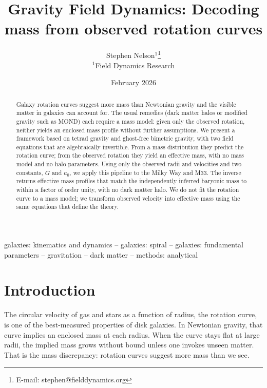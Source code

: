 \documentclass[fleqn,usenatbib]{mnras}
\title{Gravity Field Dynamics: Decoding mass from observed rotation curves}
\author[S. Nelson]{Stephen Nelson$^{1}$\thanks{E-mail: stephen@fielddynamics.org}\\
$^{1}$Field Dynamics Research}
\date{February 2026}
\begin{document}
\maketitle

\begin{abstract}
Galaxy rotation curves suggest more mass than Newtonian gravity and the visible matter in galaxies can account for. The usual remedies (dark matter halos or modified gravity such as MOND) each require a mass model: given only the observed rotation, neither yields an enclosed mass profile without further assumptions. We present a framework based on tetrad gravity and ghost-free bimetric gravity, with two field equations that are algebraically invertible. From a mass distribution they predict the rotation curve; from the observed rotation they yield an effective mass, with no mass model and no halo parameters. Using only the observed radii and velocities and two constants, $G$ and $a_0$, we apply this pipeline to the Milky Way and M33. The inverse returns effective mass profiles that match the independently inferred baryonic mass to within a factor of order unity, with no dark matter halo. We do not fit the rotation curve to a mass model; we transform observed velocity into effective mass using the same equations that define the theory.
\end{abstract}

\begin{keywords}
galaxies: kinematics and dynamics -- galaxies: spiral -- galaxies: fundamental parameters -- gravitation -- dark matter -- methods: analytical
\end{keywords}

\section{Introduction}
\label{sec:intro}

The circular velocity of gas and stars as a function of radius, the rotation curve, is one of the best-measured properties of disk galaxies. In Newtonian gravity, that curve implies an enclosed mass at each radius. When the curve stays flat at large radii, the implied mass grows without bound unless one invokes unseen matter. That is the mass discrepancy: rotation curves suggest more mass than we see.
\end{document}
